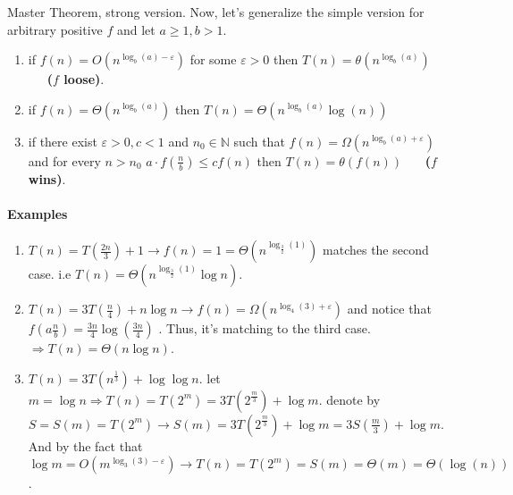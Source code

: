 \begin{defbox}{Master Theorem, strong version.} 
Now, let's generalize the simple version for arbitrary positive \(f\) and let \( a \ge 1, b > 1\). 

\newcommand{\logab}{\log_{b} \left(a\right)}

\begin{enumerate}
    \item if  \(f\left(n\right) = O \left( n^{\logab - \varepsilon }\right)\) for some \( \varepsilon > 0 \) then \( T\left(n\right) = \theta \left( n^{\logab} \right) \) \ \ \ \textbf{(\(f\) loose)}.
    
    \item if  \(f\left(n\right) = \Theta \left( n^{\logab} \right) \) then \( T\left(n\right) = \Theta \left( n^{\logab}  \log\left(n\right)\right) \)
    
    \item if there exist \(\varepsilon >0 ,c<1\) and \(n_0 \in \mathbb{N} \) such that  \(f\left(n\right) = \Omega \left( n^{\logab + \varepsilon }\right)\) and for every \( n > n_0 \) \(a \cdot f\left( \frac{n}{b} \right) \le c f\left(n\right)\)  then \( T\left(n\right) = \theta \left( f\left(n\right) \right) \) \ \ \ \textbf{(\(f\) wins)}.
    
\end{enumerate}
\end{defbox}
\newcommand{\TT}[2]{#1 T\left(\frac{n}{#2}\right)}

\paragraph{Examples}
\begin{enumerate}
    \item \( T\left(n\right) =  T\left(\frac{2n}{3}\right) + 1 \rightarrow f\left(n\right) = 1 =\Theta \left( n^{\log_{\frac{3}{2}} \left(1\right)}\right)\) matches the second case. i.e  \( T\left(n\right) = \Theta \left( n^{\log_{\frac{3}{2}} \left(1\right)}\log n \right)\).
    
    \item \( T\left(n\right) = \TT{3}{4} + n\log n \rightarrow f\left(n\right) = \Omega\left( n^{\log_{4}\left(3\right) + \varepsilon}  \right) \) and notice that \( f\left( a\frac{n}{b}\right) = \frac{3n}{4}\log\left(\frac{3n}{4}\right)\) . Thus, it's matching to the third case. \(\Rightarrow T\left(n\right) = \Theta\left(n\log n\right)\).
    
    \item \(T\left(n\right) = 3T\left( n^{\frac{1}{3}}\right) + \log\log n\). let \( m = \log n \Rightarrow T\left( n\right) = T \left(2^m \right) = 3T\left(2^{\frac{m}{3}} \right) + \log m\). denote by \(S = S\left(m\right) = T\left(2^m\right) \rightarrow S\left(m\right) = 3T\left(2^{\frac{m}{3}} \right) + \log m = 3S\left(\frac{m}{3} \right) + \log m\). And by the fact that \(\log m = O\left(m^{\log_{3}\left(3\right)-\varepsilon} \right) \rightarrow T\left(n\right) = T\left(2^m\right) = S\left(m\right) = \Theta\left(m\right) = \Theta\left( \log(n)\right) \).  
\end{enumerate}


